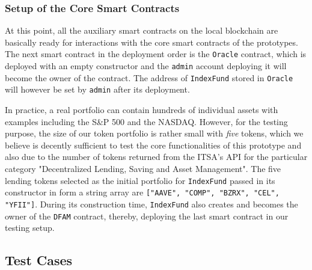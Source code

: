 \subsubsection{Setup of the Core Smart Contracts}

At this point, all the auxiliary smart contracts on the local blockchain are basically ready for interactions with the core smart contracts of the prototypes. The next smart contract in the deployment order is the \texttt{Oracle} contract, which is deployed with an empty constructor and the \texttt{admin} account deploying it will become the owner of the contract. The address of \texttt{IndexFund} stored in \texttt{Oracle} will however be set by \texttt{admin} after its deployment.  

In practice, a real portfolio can contain hundreds of individual assets with examples including the S\&P 500 and the NASDAQ. However, for the testing purpose, the size of our token portfolio is rather small with \textit{five} tokens, which we believe is decently sufficient to test the core functionalities of this prototype and also due to the number of tokens returned from the ITSA's API for the particular category "Decentralized Lending, Saving and Asset Management". The five lending tokens selected as the initial portfolio for \texttt{IndexFund} passed in its constructor in form a string array are \texttt{["AAVE", "COMP", "BZRX", "CEL", "YFII"]}. During its construction time, \texttt{IndexFund} also creates and becomes the owner of the \texttt{DFAM} contract, thereby, deploying the last smart contract in our testing setup.

\subsection{Test Cases} \label{subsec:testcase}

